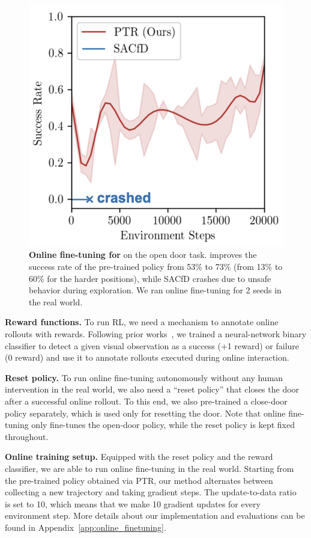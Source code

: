 \begin{figure}
\vspace{-0.7cm}
\centering
\includegraphics[width=0.75\linewidth]{chapters/ptr/online-open-door.jpeg}
\vspace{-0.24cm}
\caption{\footnotesize{\label{fig:online_door} \textbf{Online fine-tuning for \ptrmethodname} on the open door task. \ptrmethodname improves the success rate of the pre-trained policy from 53\% to 73\% (from 13\% to 60\% for the harder positions), while SACfD crashes due to unsafe behavior during exploration. We ran \ptrmethodname online fine-tuning for 2 seeds in the real world.}}
\vspace{-0.6cm}
\end{figure}

\textbf{Reward functions.} To run RL, we need a mechanism to annotate online rollouts with rewards. Following prior works~\citep{singh2019end,kalashnikov2021mt}, we trained a neural-network binary classifier to detect a given visual observation as a success (+1 reward) or failure (0 reward) and use it to annotate rollouts executed during online interaction. 

\textbf{Reset policy.} To run online fine-tuning autonomously without any human intervention in the real world, we also need a ``reset policy'' that closes the door after a successful online rollout. To this end, we also pre-trained a close-door policy separately, which is used only for resetting the door. Note that online fine-tuning only fine-tunes the open-door policy, while the reset policy is kept fixed throughout.

\textbf{Online training setup.} Equipped with the reset policy and the reward classifier, we are able to run online fine-tuning in the real world. Starting from the pre-trained policy obtained via PTR, our method alternates between collecting a new trajectory and taking gradient steps. The update-to-data ratio~\citep{redq} is set to 10, which means that we  make 10 gradient updates for every environment step. More details about our implementation and evaluations can be found in Appendix~\ref{app:online_finetuning}.

